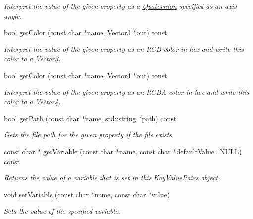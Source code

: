 \begin{DoxyCompactItemize}
\begin{DoxyCompactList}\small\item\em Interpret the value of the given property as a \hyperlink{class_i_dream_sky_1_1_quaternion}{Quaternion} specified as an axis angle. \end{DoxyCompactList}\item 
bool \hyperlink{class_i_dream_sky_1_1_key_value_pairs_ad54e68bed44956b71f165aea3b1bd9d0}{get\+Color} (const char $\ast$name, \hyperlink{class_i_dream_sky_1_1_vector3}{Vector3} $\ast$out) const 
\begin{DoxyCompactList}\small\item\em Interpret the value of the given property as an R\+GB color in hex and write this color to a \hyperlink{class_i_dream_sky_1_1_vector3}{Vector3}. \end{DoxyCompactList}\item 
bool \hyperlink{class_i_dream_sky_1_1_key_value_pairs_a3952197b070d4d96f043e5d652525c06}{get\+Color} (const char $\ast$name, \hyperlink{class_i_dream_sky_1_1_vector4}{Vector4} $\ast$out) const 
\begin{DoxyCompactList}\small\item\em Interpret the value of the given property as an R\+G\+BA color in hex and write this color to a \hyperlink{class_i_dream_sky_1_1_vector4}{Vector4}. \end{DoxyCompactList}\item 
bool \hyperlink{class_i_dream_sky_1_1_key_value_pairs_a048353f33da9f6d2b78c63bc3a20ce51}{get\+Path} (const char $\ast$name, std\+::string $\ast$path) const 
\begin{DoxyCompactList}\small\item\em Gets the file path for the given property if the file exists. \end{DoxyCompactList}\item 
const char $\ast$ \hyperlink{class_i_dream_sky_1_1_key_value_pairs_a214e9b3cd15a4a9d0b81819c64c5636e}{get\+Variable} (const char $\ast$name, const char $\ast$default\+Value=N\+U\+LL) const 
\begin{DoxyCompactList}\small\item\em Returns the value of a variable that is set in this \hyperlink{class_i_dream_sky_1_1_key_value_pairs}{Key\+Value\+Pairs} object. \end{DoxyCompactList}\item 
void \hyperlink{class_i_dream_sky_1_1_key_value_pairs_a82da83815362b6432b19af8b61e4bc26}{set\+Variable} (const char $\ast$name, const char $\ast$value)
\begin{DoxyCompactList}\small\item\em Sets the value of the specified variable. \end{DoxyCompactList}\end{DoxyCompactItemize}
